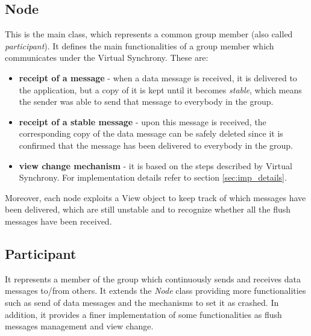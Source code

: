 \documentclass[11pt]{article}
\begin{document}
	\subsection{Node}
	This is the main class, which represents a common group member (also called \textit{participant}). It defines the main functionalities of a group member which communicates under the Virtual Synchrony. These are:
	\begin{itemize}
		\item \textbf{receipt of a message} - when a data message is received, it is delivered to the application, but a copy of it is kept until it becomes \textit{stable}, which means the sender was able to send that message to everybody in the group.
		\item \textbf{receipt of a stable message} - upon this message is received, the corresponding copy of the data message can be safely deleted since it is confirmed that the message has been delivered to everybody in the group.
		\item \textbf{view change mechanism} - it is based on the steps described by Virtual Synchrony. For implementation details refer to section \ref{sec:imp_details}.
	\end{itemize}
	Moreover, each node exploits a View object to keep track of which messages have been delivered, which are still unstable and to recognize whether all the flush messages have been received.
	
	\subsection{Participant}
	It represents a member of the group which continuously sends and receives data messages to/from others. It extends the \textit{Node} class providing more functionalities such as send of data messages and the mechanisms to set it as crashed. In addition, it provides a finer implementation of some functionalities as flush messages management and view change.
	
\end{document}
